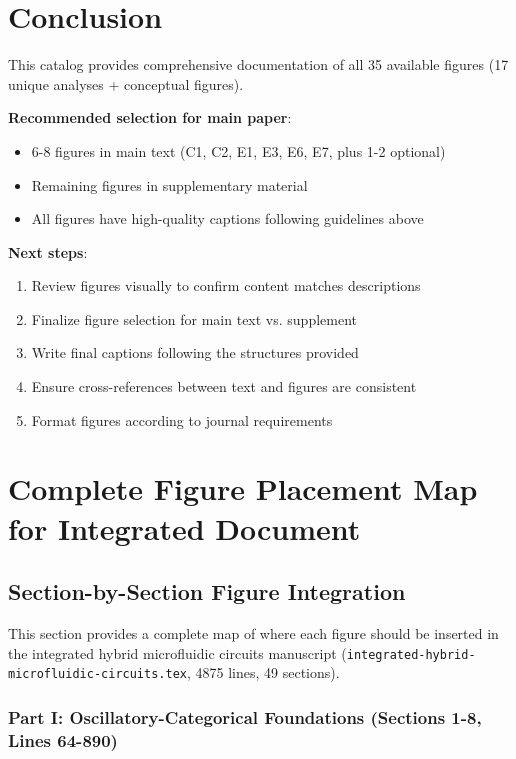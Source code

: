 \documentclass[11pt]{article}
\begin{document}
\section{Conclusion}

This catalog provides comprehensive documentation of all 35 available figures (17 unique analyses + conceptual figures). 

\textbf{Recommended selection for main paper}:
\begin{itemize}
\item 6-8 figures in main text (C1, C2, E1, E3, E6, E7, plus 1-2 optional)
\item Remaining figures in supplementary material
\item All figures have high-quality captions following guidelines above
\end{itemize}

\textbf{Next steps}:
\begin{enumerate}
\item Review figures visually to confirm content matches descriptions
\item Finalize figure selection for main text vs. supplement
\item Write final captions following the structures provided
\item Ensure cross-references between text and figures are consistent
\item Format figures according to journal requirements
\end{enumerate}

\newpage

\section{Complete Figure Placement Map for Integrated Document}

\subsection{Section-by-Section Figure Integration}

This section provides a complete map of where each figure should be inserted in the integrated hybrid microfluidic circuits manuscript (\texttt{integrated-hybrid-microfluidic-circuits.tex}, 4875 lines, 49 sections).

\subsubsection{Part I: Oscillatory-Categorical Foundations (Sections 1-8, Lines 64-890)}
\end{document}
